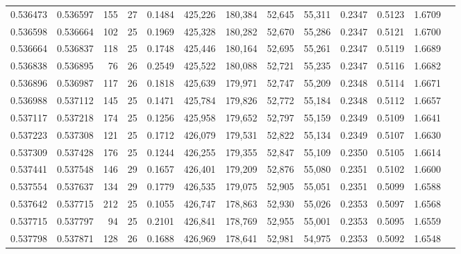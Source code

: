 \begin{tabular}{rrrrrrrrrrrrr}
0.536473 & 0.536597 & 155 &  27 &                                     0.1484 & 425,226 & 180,384 &  52,645 &  55,311 & 0.2347 & 0.5123 & 1.6709 \\
0.536598 & 0.536664 & 102 &  25 &                                     0.1969 & 425,328 & 180,282 &  52,670 &  55,286 & 0.2347 & 0.5121 & 1.6700 \\
0.536664 & 0.536837 & 118 &  25 &                                     0.1748 & 425,446 & 180,164 &  52,695 &  55,261 & 0.2347 & 0.5119 & 1.6689 \\
0.536838 & 0.536895 &  76 &  26 &                                     0.2549 & 425,522 & 180,088 &  52,721 &  55,235 & 0.2347 & 0.5116 & 1.6682 \\
0.536896 & 0.536987 & 117 &  26 &                                     0.1818 & 425,639 & 179,971 &  52,747 &  55,209 & 0.2348 & 0.5114 & 1.6671 \\
0.536988 & 0.537112 & 145 &  25 &                                     0.1471 & 425,784 & 179,826 &  52,772 &  55,184 & 0.2348 & 0.5112 & 1.6657 \\
0.537117 & 0.537218 & 174 &  25 &                                     0.1256 & 425,958 & 179,652 &  52,797 &  55,159 & 0.2349 & 0.5109 & 1.6641 \\
0.537223 & 0.537308 & 121 &  25 &                                     0.1712 & 426,079 & 179,531 &  52,822 &  55,134 & 0.2349 & 0.5107 & 1.6630 \\
0.537309 & 0.537428 & 176 &  25 &                                     0.1244 & 426,255 & 179,355 &  52,847 &  55,109 & 0.2350 & 0.5105 & 1.6614 \\
0.537441 & 0.537548 & 146 &  29 &                                     0.1657 & 426,401 & 179,209 &  52,876 &  55,080 & 0.2351 & 0.5102 & 1.6600 \\
0.537554 & 0.537637 & 134 &  29 &                                     0.1779 & 426,535 & 179,075 &  52,905 &  55,051 & 0.2351 & 0.5099 & 1.6588 \\
0.537642 & 0.537715 & 212 &  25 &                                     0.1055 & 426,747 & 178,863 &  52,930 &  55,026 & 0.2353 & 0.5097 & 1.6568 \\
0.537715 & 0.537797 &  94 &  25 &                                     0.2101 & 426,841 & 178,769 &  52,955 &  55,001 & 0.2353 & 0.5095 & 1.6559 \\
0.537798 & 0.537871 & 128 &  26 &                                     0.1688 & 426,969 & 178,641 &  52,981 &  54,975 & 0.2353 & 0.5092 & 1.6548 \\

\end{tabular}
